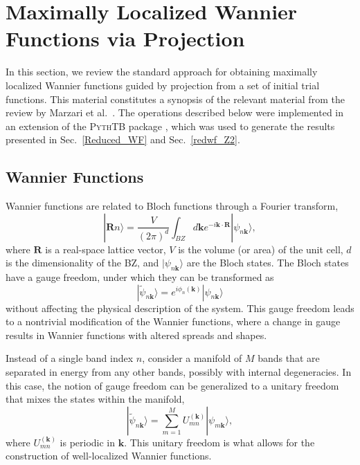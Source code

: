 \documentclass[galley,aps,pra,10pt,amsmath,amssymb,
    superscriptaddress,nofootinbib,longbibliography]{revtex4-2}
\newcounter{comm}
\newcommand{\code}[1]{\textsc{#1}}
\begin{document}
\section{Maximally Localized Wannier Functions via Projection}
\label{sec:MLWF}

In this section, we review the standard approach for obtaining maximally localized Wannier functions guided by projection from a set of initial trial functions. This material constitutes a synopsis of the relevant material from the review by Marzari et al.~\cite{marzari2012}. The operations described below were implemented in an extension of the \code{PythTB} package \cite{pythtb, cole_zenodo}, which was used to generate the results presented in Sec.~\ref{Reduced_WF} and Sec.~\ref{redwf_Z2}.

\subsection{Wannier Functions}

Wannier functions are related to Bloch functions through a Fourier transform,
\begin{equation}
    |\mathbf{R} n\rangle = \frac{V}{(2\pi)^d} \int_{BZ} d\mathbf{k} e^{-i\mathbf{k}\cdot \mathbf{R}} |\psi_{n\mathbf{k}}\rangle,
\end{equation}
where $\mathbf{R}$ is a real-space lattice vector, $V$ is the volume (or area) of the unit cell, $d$ is the dimensionality of the BZ, and $|\psi_{n\mathbf{k}}\rangle$ are the Bloch states. The Bloch states have a gauge freedom, under which they can be transformed as
\begin{equation}
    |\tilde{\psi}_{n\mathbf{k}}\rangle = e^{i\phi_n(\mathbf{k})} |\psi_{n\mathbf{k}}\rangle
\end{equation}
without affecting the physical description of the system. This gauge freedom leads to a nontrivial modification of the Wannier functions, where a change in gauge results in Wannier functions with altered spreads and shapes.

Instead of a single band index $n$, consider a manifold of $M$ bands that are separated in energy from any other bands, possibly with internal degeneracies. In this case, the notion of gauge freedom can be generalized to a unitary freedom that mixes the states within the manifold,
\begin{equation}
    |\tilde{\psi}_{n\mathbf{k}}\rangle = \sum_{m=1}^{M} U_{mn}^{(\mathbf{k})} |\psi_{m\mathbf{k}} \rangle ,
\end{equation}
where $U_{mn}^{(\mathbf{k})}$ is periodic in $\mathbf{k}$. This unitary freedom is what allows for the construction of well-localized Wannier functions. 
\end{document}
